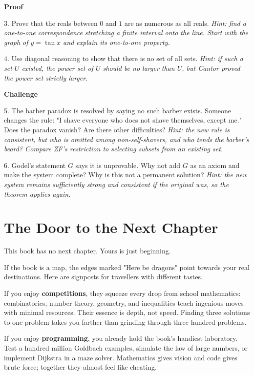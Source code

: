 \textbf{Proof}

3. Prove that the reals between $0$ and $1$ are as numerous as all reals. \emph{Hint: find a one-to-one correspondence stretching a finite interval onto the line. Start with the graph of $y = \tan x$ and explain its one-to-one property.}

4. Use diagonal reasoning to show that there is no set of all sets. \emph{Hint: if such a set $U$ existed, the power set of $U$ should be no larger than $U$, but Cantor proved the power set strictly larger.}

\textbf{Challenge}

5. The barber paradox is resolved by saying no such barber exists. Someone changes the rule: "I shave everyone who does not shave themselves, except me." Does the paradox vanish? Are there other difficulties? \emph{Hint: the new rule is consistent, but who is omitted among non-self-shavers, and who tends the barber's beard? Compare ZF's restriction to selecting subsets from an existing set.}

6. Godel's statement $G$ says it is unprovable. Why not add $G$ as an axiom and make the system complete? Why is this not a permanent solution? \emph{Hint: the new system remains sufficiently strong and consistent if the original was, so the theorem applies again.}

\section*{The Door to the Next Chapter}

This book has no next chapter. Yours is just beginning.

If the book is a map, the edges marked "Here be dragons" point towards your real destinations. Here are signposts for travellers with different tastes.

If you enjoy \textbf{competitions}, they squeeze every drop from school mathematics: combinatorics, number theory, geometry, and inequalities teach ingenious moves with minimal resources. Their essence is depth, not speed. Finding three solutions to one problem takes you farther than grinding through three hundred problems.

If you enjoy \textbf{programming}, you already hold the book's handiest laboratory. Test a hundred million Goldbach examples, simulate the law of large numbers, or implement Dijkstra in a maze solver. Mathematics gives vision and code gives brute force; together they almost feel like cheating.

